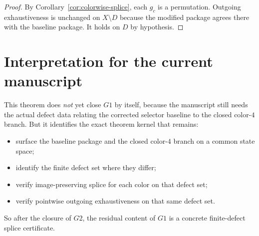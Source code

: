 \documentclass[11pt]{article}
\begin{document}
\begin{proof}
By Corollary~\ref{cor:colorwise-splice}, each \(g_c\) is a permutation.
Outgoing exhaustiveness is unchanged on \(X\setminus D\) because the modified
package agrees there with the baseline package.
It holds on \(D\) by hypothesis.
\end{proof}

\section{Interpretation for the current manuscript}
This theorem does \emph{not} yet close \(G1\) by itself, because the manuscript
still needs the actual defect data relating the corrected selector baseline to
the closed color-$4$ branch.
But it identifies the exact theorem kernel that remains:
\begin{itemize}[leftmargin=2.4em]
\item surface the baseline package and the closed color-$4$ branch on a common
      state space;
\item identify the finite defect set where they differ;
\item verify image-preserving splice for each color on that defect set;
\item verify pointwise outgoing exhaustiveness on that same defect set.
\end{itemize}
So after the closure of \(G2\), the residual content of \(G1\) is a concrete
finite-defect splice certificate.
\end{document}
